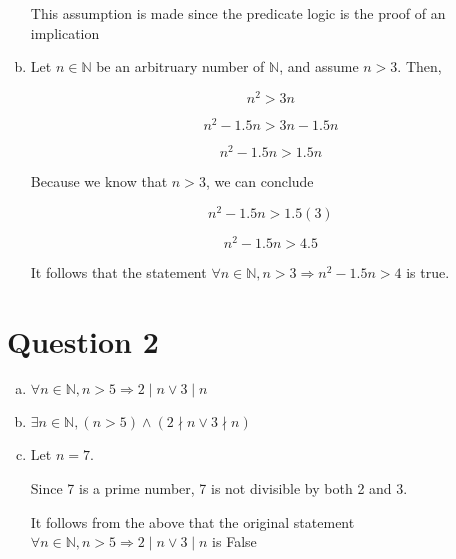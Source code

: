 \documentclass[12pt]{article}
\begin{document}
\begin{enumerate}[a.]
    This assumption is made since the predicate logic is the proof of an implication

    \item

    Let $n \in \mathbb{N}$ be an arbitruary number of $\mathbb{N}$, and assume $n > 3$. Then,

    \setcounter{equation}{0}
    \begin{equation}
        n^2 > 3n
    \end{equation}

    \begin{equation}
        n^2 -1.5n > 3n - 1.5n
    \end{equation}

    \begin{equation}
        n^2 -1.5n > 1.5n
    \end{equation}

    Because we know that $n > 3$, we can conclude

    \begin{equation}
        n^2 -1.5n > 1.5(3)
    \end{equation}

    \begin{equation}
        n^2 -1.5n > 4.5
    \end{equation}

    It follows that the statement $\forall n \in \mathbb{N}, n > 3 \Rightarrow n^2 - 1.5n > 4$ is true.

\end{enumerate}

\section*{Question 2}
\begin{enumerate}[a.]
    \item $\forall n \in \mathbb{N}, n > 5 \Rightarrow 2 \mid n \lor 3 \mid n$
    \item $\exists n \in \mathbb{N}, (n > 5) \land (2 \nmid n \lor 3 \nmid n)$
    \item

    Let $n = 7$.

    Since 7 is a prime number, 7 is not divisible by both 2 and 3.

    It follows from the above that the original statement $\forall n \in \mathbb{N}, n > 5 \Rightarrow 2 \mid n \lor 3 \mid n$ is False
\end{enumerate}
\end{document}
